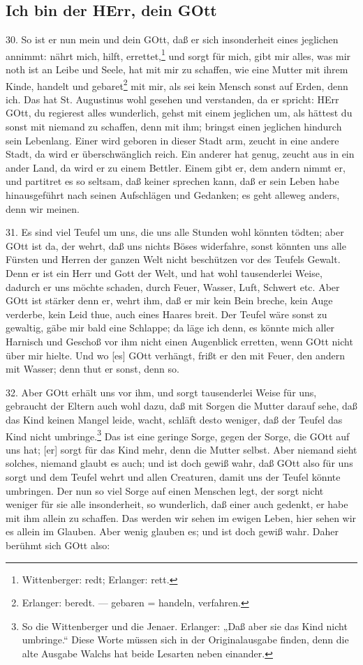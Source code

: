 \subsection{Ich bin der HErr, dein GOtt}

30. So ist er nun mein und dein GOtt, daß er sich insonderheit eines jeglichen annimmt: nährt mich, hilft, errettet,\footnote{Wittenberger: redt; Erlanger: rett.} und sorgt für mich, gibt mir alles, was mir noth ist an Leibe und Seele, hat mit mir zu schaffen, wie eine Mutter mit ihrem Kinde, handelt und gebaret\footnote{Erlanger: beredt. — gebaren = handeln, verfahren.} mit mir, als sei kein Mensch sonst auf Erden, denn ich. Das hat St. Augustinus wohl gesehen und verstanden, da er spricht: HErr GOtt, du regierest alles wunderlich, gehst mit einem jeglichen um, als hättest du sonst mit niemand zu schaffen, denn mit ihm; bringst einen jeglichen hindurch sein Lebenlang. Einer wird geboren in dieser Stadt arm, zeucht in eine andere Stadt, da wird er überschwänglich reich. Ein anderer hat genug, zeucht aus in ein ander Land, da wird er zu einem Bettler. Einem gibt er, dem andern nimmt er, und partitret es so seltsam, daß keiner sprechen kann, daß er sein Leben habe hinausgeführt nach seinen Aufschlägen und Gedanken; es geht alleweg anders, denn wir meinen.

31. Es sind viel Teufel um uns, die uns alle Stunden wohl könnten tödten; aber GOtt ist da, der wehrt, daß uns nichts Böses widerfahre, sonst könnten uns alle Fürsten und Herren der ganzen Welt nicht beschützen vor des Teufels Gewalt. Denn er ist ein Herr und Gott der Welt, und hat wohl tausenderlei Weise, dadurch er uns möchte schaden, durch Feuer, Wasser, Luft, Schwert etc. Aber GOtt ist stärker denn er, wehrt ihm, daß er mir kein Bein breche, kein Auge verderbe, kein Leid thue, auch eines Haares breit. Der Teufel wäre sonst zu gewaltig, gäbe mir bald eine Schlappe; da läge ich denn, es könnte mich aller Harnisch und Geschoß vor ihm nicht einen Augenblick erretten, wenn GOtt nicht über mir hielte. Und wo [es] GOtt verhängt, frißt er den mit Feuer, den andern mit Wasser; denn thut er sonst, denn so.

32. Aber GOtt erhält uns vor ihm, und sorgt tausenderlei Weise für uns, gebraucht der Eltern auch wohl dazu, daß mit Sorgen die Mutter darauf sehe, daß das Kind keinen Mangel leide, wacht, schläft desto weniger, daß der Teufel das Kind nicht umbringe.\footnote{So die Wittenberger und die Jenaer. Erlanger: „Daß aber sie das Kind nicht umbringe.“ Diese Worte müssen sich in der Originalausgabe finden, denn die alte Ausgabe Walchs hat beide Lesarten neben einander.} Das ist eine geringe Sorge, gegen der Sorge, die GOtt auf uns hat; [er] sorgt für das Kind mehr, denn die Mutter selbst. Aber niemand sieht solches, niemand glaubt es auch; und ist doch gewiß wahr, daß GOtt also für uns sorgt und dem Teufel wehrt und allen Creaturen, damit uns der Teufel könnte umbringen. Der nun so viel Sorge auf einen Menschen legt, der sorgt nicht weniger für sie alle insonderheit, so wunderlich, daß einer auch gedenkt, er habe mit ihm allein zu schaffen. Das werden wir sehen im ewigen Leben, hier sehen wir es allein im Glauben. Aber wenig glauben es; und ist doch gewiß wahr. Daher berühmt sich GOtt also:

